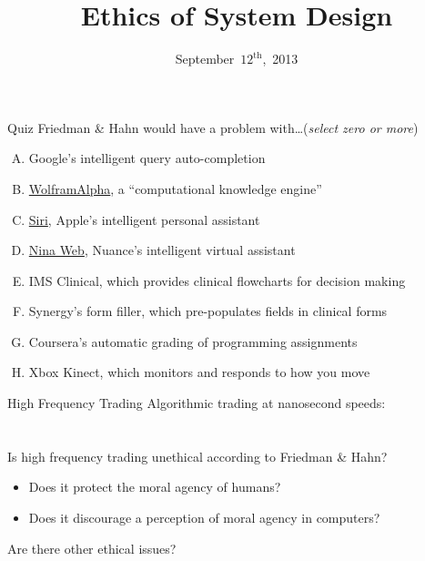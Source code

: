 \documentclass{beamer}
\title{Ethics of System Design}
\date{September~$12^{\text{th}}$,~2013}
\begin{document}
\begin{frame}
\titlepage
\end{frame}

\begin{frame}{Quiz}
Friedman \& Hahn would have a problem with\ldots \hfill (\emph{select zero or more})
\begin{enumerate}[(A)]
\item<1> Google's intelligent query auto-completion
\item<1-2> \href{http://www.wolframalpha.com/}{WolframAlpha}, a ``computational knowledge engine''
\item<1-2> \href{http://www.youtube.com/watch?v=rNsrl86inpo}{Siri}, Apple's intelligent personal assistant
\item<1-2> \href{http://www.youtube.com/watch?v=5Y6DjWw_Td8}{Nina Web}, Nuance's intelligent virtual assistant
\item<1-2> IMS Clinical, which provides clinical flowcharts for decision making
\item<1> Synergy's form filler, which pre-populates fields in clinical forms
\item<1> Coursera's automatic grading of programming assignments
\item<1> Xbox Kinect, which monitors and responds to how you move
\end{enumerate}
\end{frame}

\begin{frame}{High Frequency Trading}
Algorithmic trading at nanosecond speeds: \\
\href{http://www.colbertnation.com/the-colbert-report-videos/421265/november-14-2012/high-frequency-trading}{} \\
\href{http://www.colbertnation.com/the-colbert-report-videos/421266/november-14-2012/high-frequency-trading---christopher-steiner}{} \\
\bigskip
Is high frequency trading unethical according to Friedman \& Hahn?
\begin{itemize}
\item Does it protect the moral agency of humans?
\item Does it discourage a perception of moral agency in computers?
\end{itemize}
Are there other ethical issues?
\end{frame}
\end{document}

